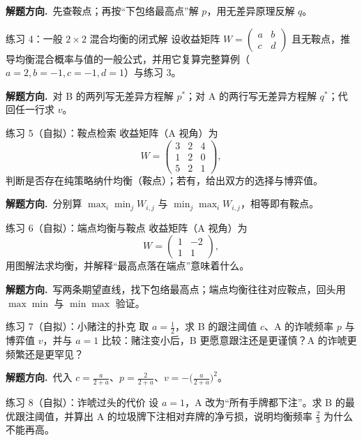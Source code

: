 \documentclass[UTF8,a4paper,11pt,oneside,openany,fontset=fandol]{ctexbook}
\theoremstyle{definition}
\newcommand{\hint}{\par\noindent\textbf{解题方向.}\ }
\begin{document}
\hint 先查鞍点；再按“下包络最高点”解 $p$，用无差异原理反解 $q$。

\begin{problem}{练习 4：一般 $2\times2$ 混合均衡的闭式解}
设收益矩阵 $W=\begin{pmatrix}a&b\\ c&d\end{pmatrix}$ 且无鞍点，推导均衡混合概率与值的一般公式，并用它复算完整算例（$a=2,b=-1,c=-1,d=1$）与练习 3。
\end{problem}

\hint 对 B 的两列写无差异方程解 $p^{*}$；对 A 的两行写无差异方程解 $q^{*}$；代回任一行求 $v$。

\begin{problem}{练习 5（自拟）：鞍点检索}
收益矩阵（A 视角）为
\[
 W=\begin{pmatrix}3&2&4\\1&2&0\\5&2&1\end{pmatrix},
\]
判断是否存在纯策略纳什均衡（鞍点）；若有，给出双方的选择与博弈值。
\end{problem}

\hint 分别算 $\max_i\min_j W_{i,j}$ 与 $\min_j\max_i W_{i,j}$，相等即有鞍点。

\begin{problem}{练习 6（自拟）：端点均衡与鞍点}
收益矩阵（A 视角）为
\[
 W=\begin{pmatrix}1&-2\\1&1\end{pmatrix},
\]
用图解法求均衡，并解释“最高点落在端点”意味着什么。
\end{problem}

\hint 写两条期望直线，找下包络最高点；端点均衡往往对应鞍点，回头用 $\max\min$ 与 $\min\max$ 验证。

\begin{problem}{练习 7（自拟）：小赌注的扑克}
取 $a=\tfrac12$，求 B 的跟注阈值 $c$、A 的诈唬频率 $p$ 与博弈值 $v$，并与 $a=1$ 比较：赌注变小后，B 更愿意跟注还是更谨慎？A 的诈唬更频繁还是更罕见？
\end{problem}

\hint 代入 $c=\tfrac{a}{2+a}$、$p=\tfrac{2}{2+a}$、$v=-\bigl(\tfrac{a}{2+a}\bigr)^{2}$。

\begin{problem}{练习 8（自拟）：诈唬过头的代价}
设 $a=1$，A 改为“所有手牌都下注”。求 B 的最优跟注阈值，并算出 A 的垃圾牌下注相对弃牌的净亏损，说明均衡频率 $\tfrac23$ 为什么不能再高。
\end{problem}
\end{document}
